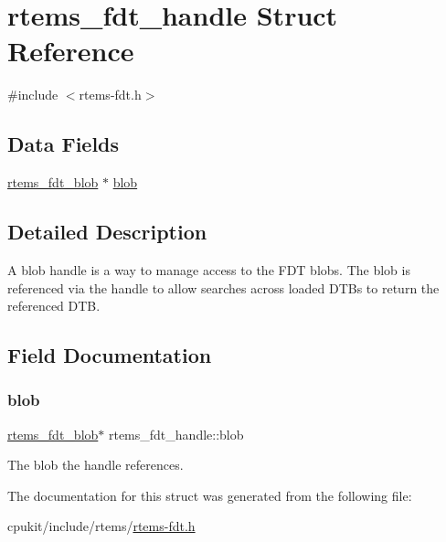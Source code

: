 \hypertarget{structrtems__fdt__handle}{}\section{rtems\+\_\+fdt\+\_\+handle Struct Reference}
\label{structrtems__fdt__handle}


{\ttfamily \#include $<$rtems-\/fdt.\+h$>$}

\subsection*{Data Fields}
\begin{DoxyCompactItemize}
\item 
\mbox{\hyperlink{structrtems__fdt__blob}{rtems\+\_\+fdt\+\_\+blob}} $\ast$ \mbox{\hyperlink{structrtems__fdt__handle_a4ccb99619713b9eeae1e7c22f791ad39}{blob}}
\end{DoxyCompactItemize}


\subsection{Detailed Description}
A blob handle is a way to manage access to the F\+DT blobs. The blob is referenced via the handle to allow searches across loaded D\+TB\textquotesingle{}s to return the referenced D\+TB. 

\subsection{Field Documentation}
\mbox{\label{structrtems__fdt__handle_a4ccb99619713b9eeae1e7c22f791ad39}} 
\subsubsection{\texorpdfstring{blob}{blob}}
{\footnotesize\ttfamily \mbox{\hyperlink{structrtems__fdt__blob}{rtems\+\_\+fdt\+\_\+blob}}$\ast$ rtems\+\_\+fdt\+\_\+handle\+::blob}

The blob the handle references. 

The documentation for this struct was generated from the following file\+:\begin{DoxyCompactItemize}
\item 
cpukit/include/rtems/\mbox{\hyperlink{rtems-fdt_8h}{rtems-\/fdt.\+h}}\end{DoxyCompactItemize}
